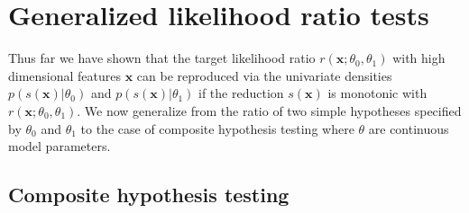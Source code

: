 \documentclass[12pt]{article}
\numberwithin{equation}{section}
\theoremstyle{plain}
\begin{document}


\section{Generalized likelihood ratio tests}
\label{sec:generalized-likelihood-ratio}

Thus far we have shown that the target likelihood ratio
$r(\mathbf{x};\theta_0,\theta_1)$
with high dimensional features $\mathbf{x}$ can be reproduced via the univariate
densities $p(s(\mathbf{x})|\theta_0)$ and $p(s(\mathbf{x})|\theta_1)$ if the
reduction $s(\mathbf{x})$ is monotonic with $r(\mathbf{x};\theta_0,\theta_1)$.
We now generalize from the ratio of two simple hypotheses specified by
$\theta_0$ and $\theta_1$ to the case of composite hypothesis testing where
$\theta$ are continuous model parameters.

\subsection{Composite hypothesis testing}
\label{sec:composite-hypothesis-testing}



%
%
%
%
\end{document}
